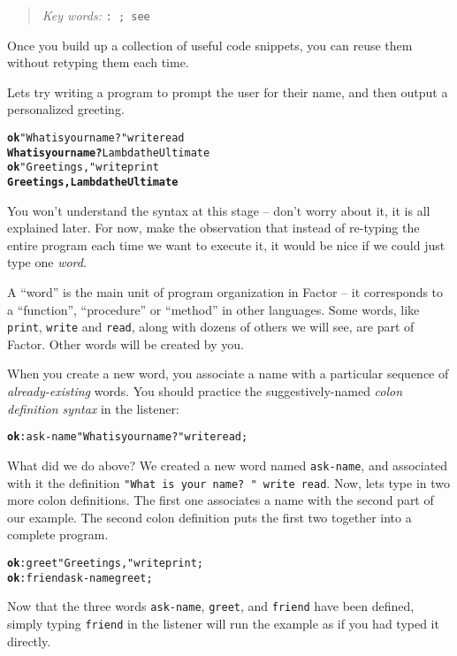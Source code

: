\documentclass[english]{book}
\newcommand{\chapkeywords}[1]{{\parbox{10cm}{\begin{minipage}[b]{10cm}
\begin{quote}
\emph{Key words:} \texttt{#1}
\end{quote}
\end{minipage}}}}
\begin{document}
\chapkeywords{:~; see}
\index{\texttt{:}}
\index{\texttt{;}}

Once you build up a collection of useful code snippets, you can reuse them without retyping them each time.

Lets try writing a program to prompt the user for their name, and then output a personalized greeting.

\begin{alltt}
\textbf{ok} "What is your name? " write read
\textbf{What is your name? }Lambda the Ultimate
\textbf{ok} "Greetings, " write print
\textbf{Greetings, Lambda the Ultimate}
\end{alltt}

You won't understand the syntax at this stage -- don't worry about it, it is all explained later. For now, make the observation that instead of re-typing the entire program each time we want to execute it, it would be nice if we could just type one \emph{word}.

A ``word'' is the main unit of program organization
in Factor -- it corresponds to a ``function'', ``procedure''
or ``method'' in other languages. Some words, like \texttt{print}, \texttt{write} and  \texttt{read}, along with dozens of others we will see, are part of Factor. Other words will be created by you.

When you create a new word, you associate a name with a particular sequence of \emph{already-existing} words. You should practice the suggestively-named \emph{colon definition syntax} in the listener:

\begin{alltt}
\textbf{ok} : ask-name "What is your name? " write read ;
\end{alltt}

What did we do above? We created a new word named \texttt{ask-name}, and associated with it the definition \texttt{"What is your name? " write read}. Now, lets type in two more colon definitions. The first one associates a name with the second part of our example. The second colon definition puts the first two together into a complete program.

\begin{alltt}
\textbf{ok} : greet "Greetings, " write print ;
\textbf{ok} : friend ask-name greet ;
\end{alltt}

Now that the three words \texttt{ask-name}, \texttt{greet}, and \texttt{friend} have been defined, simply typing \texttt{friend} in the listener will run the example as if you had typed it directly.
\end{document}

